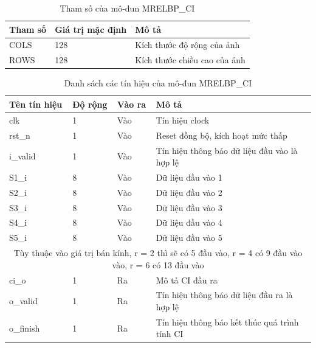 \begin{table}[!ht]
    \centering
    \renewcommand{\arraystretch}{1.3} %
        \caption{Tham số của mô-đun MRELBP\_CI}
    \begin{tabular}{|p{3cm} p{4cm} p{8cm}|}
        \hline
        \rowcolor{gray!30}
        \textbf{Tham số } & \textbf{Giá trị mặc định}  & \textbf{Mô tả} \\
        \hline
        COLS & 128 & Kích thước độ rộng của ảnh
        \\ \hline
        ROWS & 128 & Kích thước chiều cao của ảnh
        \\
        \hline
    \end{tabular}

    \label{tab:paramListCICAL}
\end{table}
\begin{table}[!ht]
    \centering
    \renewcommand{\arraystretch}{1.3} %
    \caption{Danh sách các tín hiệu của mô-đun MRELBP\_CI}
    \begin{tabular}{|p{3cm} p{2cm} p{2cm} p{8cm}|}
        \hline
        \rowcolor{gray!30}
        \textbf{Tên tín hiệu} & \textbf{Độ rộng} & \textbf{Vào ra} & \textbf{Mô tả} \\
        \hline
        clk & 1 & Vào & Tín hiệu clock \\
        \hline
        rst\_n & 1 & Vào & Reset đồng bộ, kích hoạt mức thấp \\
        \hline 
        i\_valid & 1 & Vào & Tín hiệu thông báo dữ liệu đầu vào là hợp lệ
        \\ \hline
        S1\_i & 8 & Vào & Dữ liệu đầu vào 1
        \\ \hline
        S2\_i & 8 & Vào & Dữ liệu đầu vào 2
        \\ \hline
                S3\_i & 8 & Vào & Dữ liệu đầu vào 3
        \\ \hline
                S4\_i & 8 & Vào & Dữ liệu đầu vào 4
        \\ \hline
                        S5\_i & 8 & Vào & Dữ liệu đầu vào 5
        \\ \hline
        \multicolumn{4}{|c|}{Tùy thuộc vào giá trị bán kính, r = 2 thì sẽ có 5 đầu vào, r = 4 có 9 đầu vào vào, r = 6 có 13 đầu vào}
        \\ \hline
        ci\_o & 1 & Ra & Mô tả CI đầu ra
        \\ \hline
        o\_valid & 1 & Ra & Tín hiệu thông báo dữ liệu đầu ra là hợp lệ
        \\ \hline
        o\_finish & 1 & Ra & Tín hiệu thông báo kết thúc quá trình tính CI
        \\ \hline
       
    \end{tabular}

    \label{tab:signalListCICAL}
\end{table}
